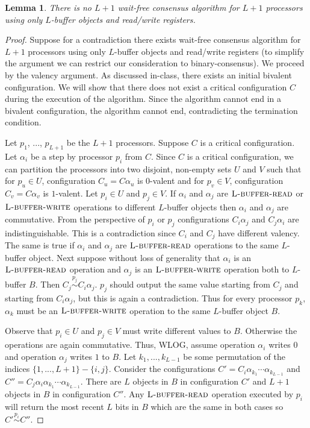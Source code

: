 \documentclass[11pt]{article}
\newcommand\lbufread{\textsc{L-buffer-read}}
\newcommand\lbufwrite{\textsc{L-buffer-write}}
\newtheorem{lemma}[theorem]{Lemma}
\begin{document}
\begin{lemma}
\label{lem:nol+1procwaitfree}
There is no $L+1$ wait-free consensus algorithm for $L+1$ processors using only $L$-buffer objects and read/write registers.
\end{lemma}
\begin{proof}
Suppose for a contradiction there exists wait-free consensus algorithm for $L+1$ processors using only $L$-buffer objects and read/write registers (to simplify the argument we can restrict our consideration to binary-consensus). We proceed by the valency argument. As discussed in-class, there exists an initial bivalent configuration. We will show that there does not exist a critical configuration $C$ during the execution of the algorithm. Since the algorithm cannot end in a bivalent configuration, the algorithm cannot end, contradicting the termination condition.

Let $p_1$, ..., $p_{L+1}$ be the $L+1$ processors. Suppose $C$ is a critical configuration. Let $\alpha_i$ be a step by processor $p_i$ from $C$. Since $C$ is a critical configuration, we can partition the processors into two disjoint, non-empty sets $U$ and $V$ such that for $p_u \in U$, configuration $C_u = C\alpha_u$ is $0$-valent and for $p_v \in V$, configuration $C_v = C\alpha_v$ is $1$-valent. Let $p_i \in U$ and $p_j \in V$. If $\alpha_i$ and $\alpha_j$ are $\lbufread$ or $\lbufwrite$ operations to different $L$-buffer objects then $\alpha_i$ and $\alpha_j$ are commutative. From the perspective of $p_i$ or $p_j$ configurations $C_i \alpha_j$ and $C_j\alpha_i$ are indistinguishable. This is a contradiction since $C_i$ and $C_j$ have different valency. The same is true if $\alpha_i$ and $\alpha_j$ are $\lbufread$ operations to the same $L$-buffer object. Next suppose without loss of generality that $\alpha_i$ is an $\lbufread$ operation and $\alpha_j$ is an $\lbufwrite$ operation both to $L$-buffer $B$. Then $C_j \stackrel{p_j}{\sim} C_i\alpha_j$. $p_j$ should output the same value starting from $C_j$ and starting from $C_i \alpha_j$, but this is again a contradiction. Thus for every processor $p_k$, $\alpha_k$ must be an $\lbufwrite$ operation to the same $L$-buffer object $B$. 

Observe that $p_i \in U$ and $p_j \in V$ must write different values to $B$. Otherwise the operations are again commutative. Thus, WLOG, assume operation $\alpha_i$ writes $0$ and operation $\alpha_j$ writes $1$ to $B$. Let $k_1, ..., k_{L-1}$ be some permutation of the indices $\{1, ..., L+1\} - \{i, j\}$. Consider the configurations $C' = C_i\alpha_{k_1}\cdots\alpha_{k_{L-1}}$ and $C'' = C_j\alpha_i\alpha_{k_1}\cdots\alpha_{k_{L-1}}$. There are $L$ objects in $B$ in configuration $C'$ and $L+1$ objects in $B$ in configuration $C''$. Any $\lbufread$ operation executed by $p_i$ will return the most recent $L$ bits in $B$ which are the same in both cases so $C' \stackrel{p_i}{\sim} C''$. 


\end{proof}
\end{document}
